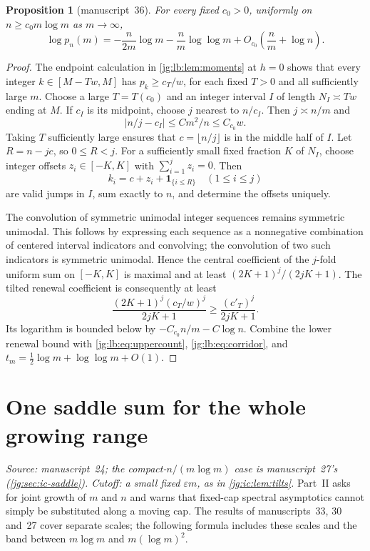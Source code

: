 \documentclass[11pt,a4paper]{article}
\newtheorem{proposition}[proposition]{Proposition}
\theoremstyle{definition}\newaliascnt{definition}{theorem}
\theoremstyle{remark}\newaliascnt{remark}{theorem}
\newcommand{\one}{\mathbf 1}
\begin{document}
\begin{proposition}[manuscript~36]\label{jg:lb:prop:elementary}
For every fixed $c_0>0$, uniformly on $n\ge c_0m\log m$ as $m\to\infty$,
\[
 \log p_n(m)
 =-\frac{n}{2m}\log m-\frac nm\log\log m
       +O_{c_0}\!\left(\frac nm+\log n\right).
\]
\end{proposition}
\begin{proof}
The endpoint calculation in \cref{jg:lb:lem:moments} at $h=0$ shows that every
integer $k\in[M-Tw,M]$ has $p_k\ge c_T/w$, for each fixed $T>0$ and all
sufficiently large $m$. Choose a large $T=T(c_0)$ and an integer interval $I$ of
length $N_I\asymp Tw$ ending at $M$. If $c_I$ is its midpoint, choose $j$
nearest to $n/c_I$. Then $j\asymp n/m$ and
\[
 |n/j-c_I|\le C m^2/n\le C_{c_0}w.
\]
Taking $T$ sufficiently large ensures that $c=\lfloor n/j\rfloor$ is in the
middle half of $I$. Let $R=n-jc$, so $0\le R<j$. For a sufficiently small fixed
fraction $K$ of $N_I$, choose integer offsets $z_i\in[-K,K]$ with
$\sum_{i=1}^jz_i=0$. Then
\[
 k_i=c+z_i+\one_{\{i\le R\}}\quad(1\le i\le j)
\]
are valid jumps in $I$, sum exactly to $n$, and determine the offsets uniquely.

The convolution of symmetric unimodal integer sequences remains symmetric
unimodal. This follows by expressing each sequence as a nonnegative combination
of centered interval indicators and convolving; the convolution of two such
indicators is symmetric unimodal. Hence the central coefficient of the $j$-fold
uniform sum on $[-K,K]$ is maximal and at least $(2K+1)^j/(2jK+1)$. The tilted
renewal coefficient is consequently at least
\[
 \frac{(2K+1)^j(c_T/w)^j}{2jK+1}
 \ge\frac{(c'_T)^j}{2jK+1}.
\]
Its logarithm is bounded below by $-C_{c_0}n/m-C\log n$. Combine the lower
renewal bound with \eqref{jg:lb:eq:uppercount}, \eqref{jg:lb:eq:corridor}, and
$t_m=\tfrac12\log m+\log\log m+O(1)$.
\end{proof}

\section{One saddle sum for the whole growing range}
\label{jg:sec:saddle}
\emph{Source: manuscript~24; the compact-$n/(m\log m)$ case is manuscript~27's
(\cref{jg:sec:ic-saddle}). Cutoff: a small fixed $\varepsilon m$, as in
\cref{jg:ic:lem:tilts}.}
Part~II asks for joint growth of $m$ and $n$ and warns that fixed-cap spectral
asymptotics cannot simply be substituted along a moving cap. The results of
manuscripts~33, 30 and~27 cover separate scales; the following formula includes
these scales and the band between $m\log m$ and $m(\log m)^2$.
\end{document}
